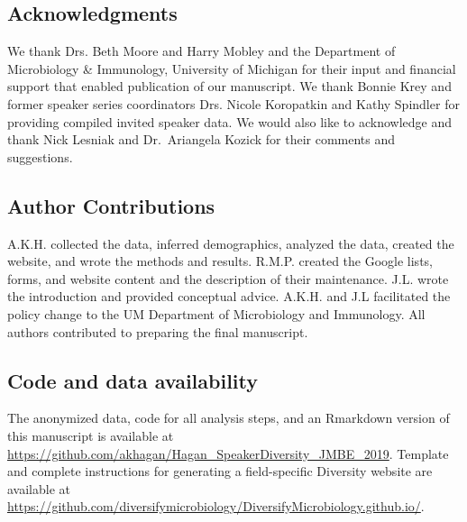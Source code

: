 \documentclass[10pt,]{article}
\begin{document}
\subsection{Acknowledgments}\label{acknowledgments}

We thank Drs. Beth Moore and Harry Mobley and the Department of
Microbiology \& Immunology, University of Michigan for their input and
financial support that enabled publication of our manuscript. We thank
Bonnie Krey and former speaker series coordinators Drs. Nicole
Koropatkin and Kathy Spindler for providing compiled invited speaker
data. We would also like to acknowledge and thank Nick Lesniak and
Dr.~Ariangela Kozick for their comments and suggestions.

\subsection{Author Contributions}\label{author-contributions}

A.K.H. collected the data, inferred demographics, analyzed the data,
created the website, and wrote the methods and results. R.M.P. created
the Google lists, forms, and website content and the description of
their maintenance. J.L. wrote the introduction and provided conceptual
advice. A.K.H. and J.L facilitated the policy change to the UM
Department of Microbiology and Immunology. All authors contributed to
preparing the final manuscript.

\subsection{Code and data
availability}\label{code-and-data-availability}

The anonymized data, code for all analysis steps, and an Rmarkdown
version of this manuscript is available at
\url{https://github.com/akhagan/Hagan_SpeakerDiversity_JMBE_2019}.
Template and complete instructions for generating a field-specific
Diversity website are available at
\url{https://github.com/diversifymicrobiology/DiversifyMicrobiology.github.io/}.
\end{document}
